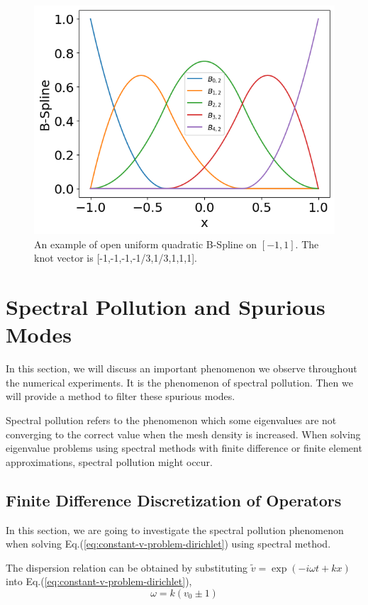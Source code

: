 \begin{figure} [H]
	\centering
	\includegraphics[width=0.7\linewidth]{img/bspline}
	\caption{An example of open uniform quadratic B-Spline on $[-1,1]$. The knot vector is [-1,-1,-1,-1/3,1/3,1,1,1].}
	\label{fig:bspline}
\end{figure}



\section{Spectral Pollution and Spurious Modes}
In this section, we will discuss an important phenomenon we observe throughout the numerical experiments. It is the phenomenon of spectral pollution. Then we will provide a method to filter these spurious modes.

Spectral pollution refers to the phenomenon which some eigenvalues are not converging to the correct value when the mesh density is increased. When solving eigenvalue problems using spectral methods with finite difference or finite element approximations, spectral pollution might occur. \cite{llobet_spectral_1990}

\subsection{Finite Difference Discretization of Operators}
In this section, we are going to investigate the spectral pollution phenomenon when solving Eq.(\ref{eq:constant-v-problem-dirichlet}) using spectral method.

The dispersion relation can be obtained by substituting $\tilde{v} = \exp(-i\omega t + kx)$ into Eq.(\ref{eq:constant-v-problem-dirichlet}),
\begin{equation} \label{dispersion-relation}
	\omega = k(v_0 \pm 1)
\end{equation}

